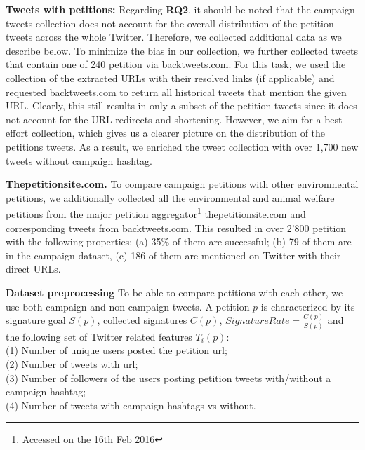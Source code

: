 \textbf{Tweets with petitions:}
Regarding \textbf{RQ2},
it should be noted that the campaign tweets collection does not account for the overall distribution of the petition tweets across the whole Twitter. 
Therefore, we collected additional data as we describe below.
To minimize the bias in our collection, we further collected tweets that contain one of 240 petition via \url{backtweets.com}. For this task, we used the collection of the extracted URLs with their resolved links (if applicable) and requested \url{backtweets.com} to return all historical tweets that mention the given URL.
Clearly, this still results in only a subset of the petition tweets since it does not account for the URL redirects and shortening. However, we aim for a best effort collection, which gives us a clearer picture on the distribution of the petitions tweets.
As a result, we enriched the tweet collection with over 1,700 new tweets without campaign hashtag.

\textbf{Thepetitionsite.com.} To compare campaign petitions with other environmental petitions, we additionally collected all the environmental and animal welfare petitions from the major petition aggregator\footnote{Accessed on the 16th Feb 2016} \url{thepetitionsite.com} and corresponding tweets from \url{backtweets.com}. This resulted in over 2'800 petition with the following properties: (a) 35\% of them are successful; (b) 79 of them are in the campaign dataset, (c) 186 of them are mentioned on Twitter with their direct URLs.

\textbf{Dataset preprocessing}
To be able to compare petitions with each other, we use both campaign and non-campaign tweets.
A petition $p$ is characterized by its signature goal $S(p)$, collected signatures $C(p)$, $SignatureRate = \frac{C(p)}{S(p)}$ and the following set of Twitter related features $T_i(p)$:\\
(1) Number of unique users posted the petition url;\\
(2) Number of tweets with url;\\
(3) Number of followers of the users posting petition tweets with/without a campaign hashtag;\\
(4) Number of tweets with campaign hashtags vs without.